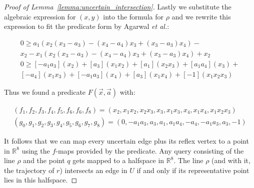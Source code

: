 \documentclass[a4paper, UKenglish]{paper}
\newcommand{\etal}{\textit{et al.}\xspace}
\begin{document}
\begin{proof}[Proof of Lemma~\ref{lemma:uncertain_intersection}]
Lastly we substitute the algebraic expression for $(x,y)$ into the formula for $\rho$ and we rewrite this expression to fit the predicate form by Agarwal \etal \cite{agarwal2013range}:

\begin{align*}
    0 \ge a_1 (x_2 (x_3 - a_3) - (x_4 - a_4)x_3 + (x_3 - a_3) x_4) - \\
    x_2 - x_1 (x_2 (x_3 - a_3) - (x_4 - a_4)x_3 + (x_3 - a_3) x_4) + x_2 \\
    0 \ge [-a_1 a_3] (x_2) + [a_3]( x_1 x_2) + [a_1] (x_2 x_3) + [a_1a_4] (x_3) + \\
    [- a_4] (x_1 x_3) + [- a_1 a_3]( x_4) + [a_3] (x_1 x_4) + [-1](x_1 x_2 x_3)
\end{align*}

Thus we found a predicate $F(\vec{x}, \vec{a})$ with:

\begin{align*}
    (f_1, f_2, f_3, f_4, f_5, f_6, f_6, f_8) = (x_2, x_1x_2, x_2x_3, x_3, x_1x_3, x_4, x_1x_4, x_1x_2x_3) \\
    (g_0, g_1, g_2, g_3, g_4, g_5,g_6, g_7,g_8) = (0, -a_1a_3, a_3, a_1, a_1a_4, -a_4, -a_1a_3, a_3, -1)
\end{align*}

It follows that we can map every uncertain edge plus its reflex vertex to a point in $\mathbb{R}^8$ using the $f$-maps provided by the predicate. Any query consisting of the line $\rho$ and the point $q$ gets mapped to a halfspace in $\mathbb{R}^8$. The line $\rho$ (and with it, the trajectory of $r$) intersects an edge in $U$ if and only if its representative point lies in this halfspace. 
\end{proof}
\end{document}
